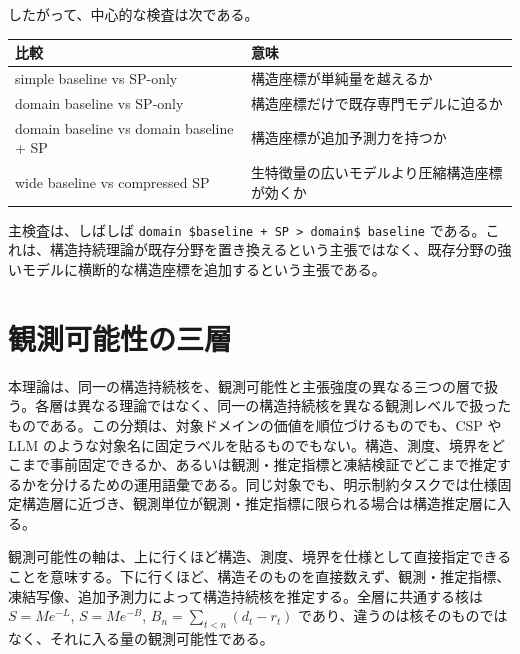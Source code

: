 \documentclass[12pt,a4paper]{article}
\begin{document}
したがって、中心的な検査は次である。

{\def\LTcaptype{table} %
\begin{longtable}[]{@{}
  >{\raggedright\arraybackslash}p{}
  >{\raggedright\arraybackslash}p{}@{}}
\toprule\noalign{}
\begin{minipage}[b]{\linewidth}\raggedright
比較
\end{minipage} & \begin{minipage}[b]{\linewidth}\raggedright
意味
\end{minipage} \\
\midrule\noalign{}
\endhead
\bottomrule\noalign{}
\endlastfoot
simple baseline vs SP-only & 構造座標が単純量を越えるか \\
domain baseline vs SP-only & 構造座標だけで既存専門モデルに迫るか \\
domain baseline vs domain baseline + SP & 構造座標が追加予測力を持つか \\
wide baseline vs compressed SP & 生特徴量の広いモデルより圧縮構造座標が効くか \\
\end{longtable}
}

主検査は、しばしば \texttt{domain\ \$baseline\ +\ SP\ \textgreater{}\ domain\$\ baseline} である。これは、構造持続理論が既存分野を置き換えるという主張ではなく、既存分野の強いモデルに横断的な構造座標を追加するという主張である。

\section{観測可能性の三層}\label{ux89b3ux6e2cux53efux80fdux6027ux306eux4e09ux5c64}

本理論は、同一の構造持続核を、観測可能性と主張強度の異なる三つの層で扱う。各層は異なる理論ではなく、同一の構造持続核を異なる観測レベルで扱ったものである。この分類は、対象ドメインの価値を順位づけるものでも、CSP や LLM のような対象名に固定ラベルを貼るものでもない。構造、測度、境界をどこまで事前固定できるか、あるいは観測・推定指標と凍結検証でどこまで推定するかを分けるための運用語彙である。同じ対象でも、明示制約タスクでは仕様固定構造層に近づき、観測単位が観測・推定指標に限られる場合は構造推定層に入る。

観測可能性の軸は、上に行くほど構造、測度、境界を仕様として直接指定できることを意味する。下に行くほど、構造そのものを直接数えず、観測・推定指標、凍結写像、追加予測力によって構造持続核を推定する。全層に共通する核は \(S=Me^{-L}\), \(S=Me^{-B}\), \(B_{n}=\sum_{t<n}(d_{t}-r_{t})\) であり、違うのは核そのものではなく、それに入る量の観測可能性である。
\end{document}

